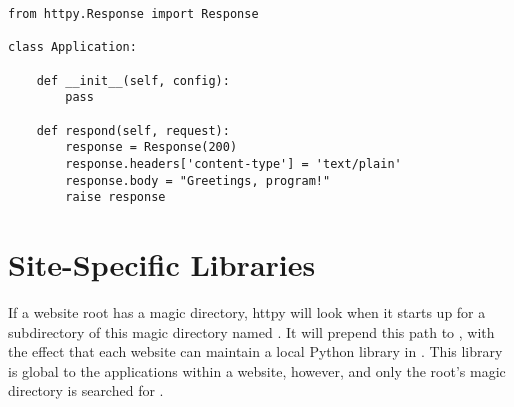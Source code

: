 \begin{verbatim}
from httpy.Response import Response

class Application:

    def __init__(self, config):
        pass

    def respond(self, request):
        response = Response(200)
        response.headers['content-type'] = 'text/plain'
        response.body = "Greetings, program!"
        raise response

\end{verbatim}



\section{Site-Specific Libraries}

If a website root has a magic directory, httpy will look when it starts up for a
subdirectory of this magic directory named . It will prepend
this path to , with the effect that each website can maintain a
local Python library in . This library is
global to the applications within a website, however, and only the root's magic
directory is searched for .


